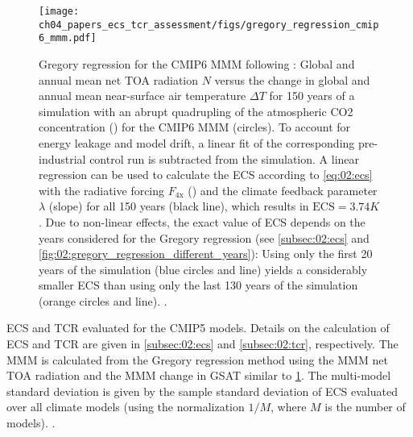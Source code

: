 \begin{figure}[t]
  \centering
  \texttt{[image: 
    ch04\_papers\_ecs\_tcr\_assessment/figs/gregory\_regression\_cmip6\_mmm.pdf]}
  \caption{Gregory regression for the \acs{CMIP}6 \acf{MMM} following
    \textcite{Gregory2004}: Global and annual mean net \acl{TOA} radiation $N$
    versus the change in global and annual mean near-surface air temperature
    $\Delta T$ for 150 years of a simulation with an abrupt quadrupling of the
    atmospheric \acs{CO2} concentration () for the \acs{CMIP}6
    \acs{MMM} (circles). To account for energy leakage and model drift, a
    linear fit of the corresponding pre-industrial control run is subtracted
    from the  simulation. A linear regression can be used to
    calculate the \acf{ECS} according to \cref{eq:02:ecs} with the radiative
    forcing $F_\text{4x}$ (\yintercept) and the climate feedback parameter
    $\lambda$ (slope) for all 150 years (black line), which results in
    $\text{ECS} = 3.74 \unit{K}$. Due to non-linear effects, the exact value
    of \acs{ECS} depends on the years considered for the Gregory regression
    (see \cref{subsec:02:ecs} and
    \cref{fig:02:gregory_regression_different_years}): Using only the first 20
    years of the simulation (blue circles and line) yields a considerably
    smaller \acs{ECS} than using only the last 130 years of the simulation
    (orange circles and line). .}
  \label{fig:04:gregory_regression_cmip6_mmm}
\end{figure}

\begin{table}[!t]
  \centering
  \caption{\acf{ECS} and \acf{TCR} evaluated for the \acs{CMIP}5 models.
    Details on the calculation of \acs{ECS} and \acs{TCR} are given in
    \cref{subsec:02:ecs} and \cref{subsec:02:tcr}, respectively. The \acf{MMM}
    is calculated from the Gregory regression method using the \acs{MMM} net
    \acf{TOA} radiation and the \acs{MMM} change in \acf{GSAT} similar to
    \cref{fig:04:gregory_regression_cmip6_mmm}. The multi-model standard
    deviation is given by the sample standard deviation of \acs{ECS} evaluated
    over all climate models (using the normalization $1 / M$, where $M$ is the
    number of models). .}
  \label{tab:04:ecs_tcr_cmip5}
\end{table}

